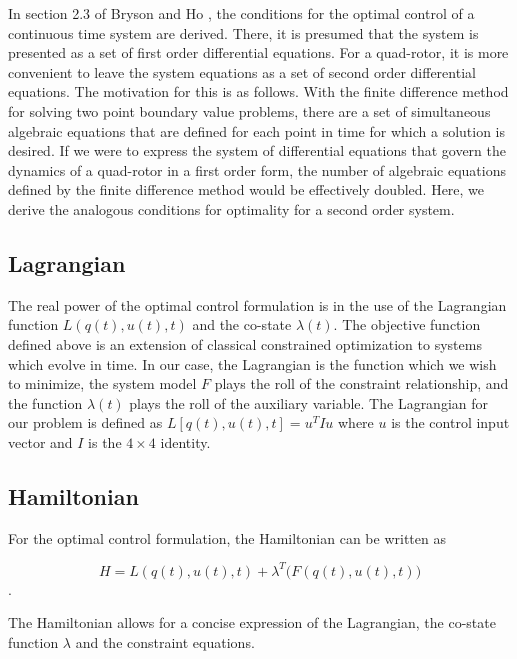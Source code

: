     In section 2.3 of Bryson and Ho \cite{BrysonHo69}, the conditions for the optimal control of a continuous time system are derived. There, it is presumed that the system is  presented as a set of first order differential equations. For a quad-rotor, it is more convenient to leave the system equations as a set of second order differential equations. The motivation for this is as follows. With the finite difference method for solving two point boundary value problems, there are a set of simultaneous algebraic equations that are defined for each point in time for which a solution is desired. If we were to express the system of differential equations that govern the dynamics of a quad-rotor in a first order form, the number of algebraic equations defined by the finite difference method would be effectively doubled. Here, we derive the analogous conditions for optimality for a second order system.

\subsection{Lagrangian}

The real power of the optimal control formulation is in the use of the Lagrangian function $L(q(t),u(t),t)$ and the co-state $\lambda(t)$. The objective function defined above is an extension of classical constrained optimization to systems which evolve in time. In our case, the Lagrangian is the function which we wish to minimize, the system model $F$ plays the roll of the constraint relationship, and the function $\lambda(t)$ plays the roll of the auxiliary variable. The Lagrangian for our problem is defined as $ L[q(t),u(t),t] = u^T I u $ where $u$ is the control input vector and $I$ is the $4\times4$ identity.



\subsection{Hamiltonian}

For the optimal control formulation, the Hamiltonian can be written as

\begin{equation}
    H = L(q(t),u(t),t) + \lambda^T \big( F(q(t),u(t),t) \big)
\end{equation}.

The Hamiltonian allows for a concise expression of the Lagrangian, the co-state function $\lambda$ and the constraint equations.


